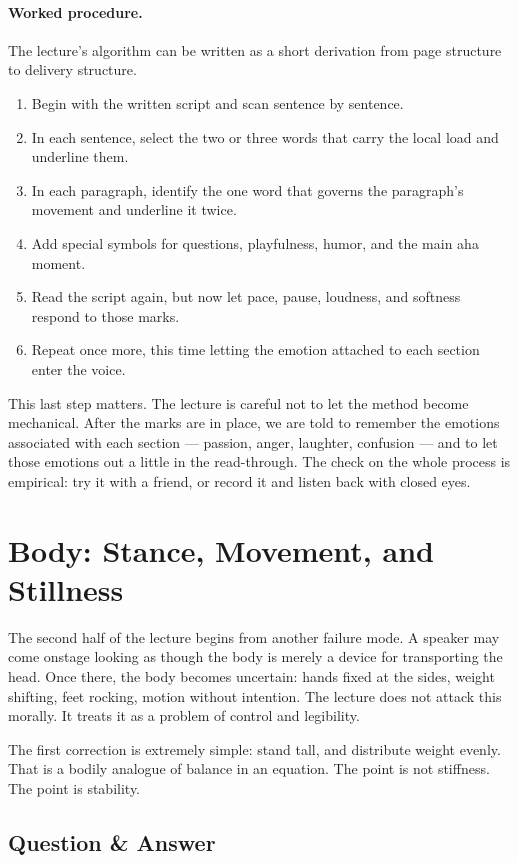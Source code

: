 \paragraph{Worked procedure.} The lecture's algorithm can be written as a short derivation from page structure to delivery structure.
\begin{enumerate}
\item Begin with the written script and scan sentence by sentence.
\item In each sentence, select the two or three words that carry the local load and underline them.
\item In each paragraph, identify the one word that governs the paragraph's movement and underline it twice.
\item Add special symbols for questions, playfulness, humor, and the main aha moment.
\item Read the script again, but now let pace, pause, loudness, and softness respond to those marks.
\item Repeat once more, this time letting the emotion attached to each section enter the voice.
\end{enumerate}

This last step matters. The lecture is careful not to let the method become mechanical. After the marks are in place, we are told to remember the emotions associated with each section --- passion, anger, laughter, confusion --- and to let those emotions out a little in the read-through. The check on the whole process is empirical: try it with a friend, or record it and listen back with closed eyes.

\section{Body: Stance, Movement, and Stillness}

The second half of the lecture begins from another failure mode. A speaker may come onstage looking as though the body is merely a device for transporting the head. Once there, the body becomes uncertain: hands fixed at the sides, weight shifting, feet rocking, motion without intention. The lecture does not attack this morally. It treats it as a problem of control and legibility.

The first correction is extremely simple: stand tall, and distribute weight evenly. That is a bodily analogue of balance in an equation. The point is not stiffness. The point is stability.

\subsection{Question \& Answer}

